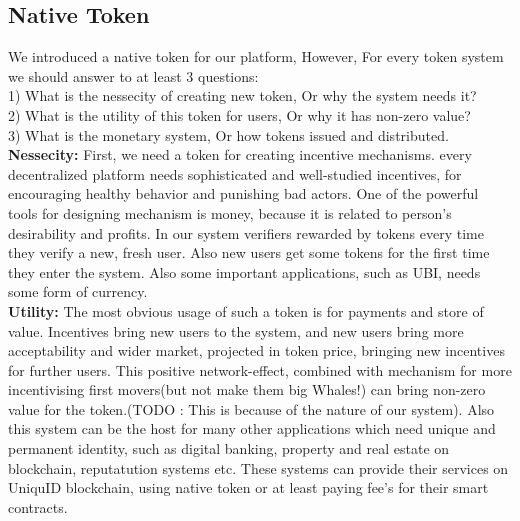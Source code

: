 \documentclass{article}
\begin{document}
\subsection{Native Token}
We introduced a native token for our platform, However, For every  token system we should answer to at least 3 questions:
\\
1) What is the nessecity of creating new token, Or why the system needs it?
\\
2) What is the utility of this token for users, Or why it has non-zero value?
\\
3) What is the monetary system, Or how tokens issued and distributed.
\\
\textbf{Nessecity:} First, we need a token for creating incentive mechanisms. every decentralized platform needs sophisticated and well-studied incentives, for encouraging healthy behavior and punishing bad actors. One of the powerful tools for designing mechanism is money, because it is related to person's desirability and profits. In our system verifiers rewarded by tokens every time they verify a new, fresh user. Also new users get some tokens for the first time they enter the system. Also some important applications, such as UBI, needs some form of currency.
\\
\textbf{Utility:} The most obvious usage of such a token is for payments and store of value. Incentives bring new users to the system, and new users bring more acceptability and wider market, projected in token price, bringing new incentives for further users. This positive network-effect, combined with mechanism for more incentivising first movers(but not make them big Whales!) can bring non-zero value for the token.(TODO : This is because of the nature of our system). Also this system can be the host for many other applications which need unique and permanent identity, such as digital banking, property and real estate on blockchain, reputatution systems etc. These systems can provide their services on UniquID blockchain, using native token or at least paying fee's for their smart contracts.
\\
\end{document}
